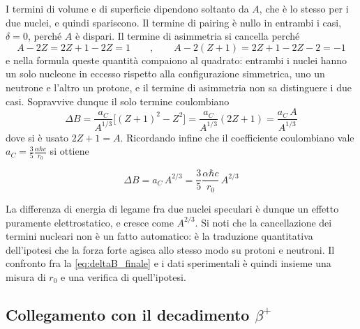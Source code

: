I termini di volume e di superficie dipendono soltanto da $A$, che è lo stesso per i due nuclei, e quindi spariscono. Il termine di pairing è nullo in entrambi i casi, $\delta = 0$, perché $A$ è dispari. Il termine di asimmetria si cancella perché
%
\begin{equation*}
    A - 2Z = 2Z + 1 - 2Z = 1 \qquad , \qquad A - 2(Z+1) = 2Z+1-2Z-2 = -1
\end{equation*}
e nella formula queste quantità compaiono al quadrato: entrambi i nuclei hanno un solo nucleone in eccesso rispetto alla configurazione simmetrica, uno un neutrone e l'altro un protone, e il termine di asimmetria non sa distinguere i due casi. Sopravvive dunque il solo termine coulombiano
%
\begin{equation}
    \Delta B = \frac{a_C}{A^{1/3}}\Big[(Z+1)^2 - Z^2\Big] = \frac{a_C}{A^{1/3}}\left(2Z+1\right) = \frac{a_C \, A}{A^{1/3}}
    \label{eq:deltaB_speculari}
\end{equation}
dove si è usato $2Z + 1 = A$. Ricordando infine che il coefficiente coulombiano vale $a_C = \frac{3}{5}\frac{\alpha \hbar c}{r_0}$ si ottiene

\begin{tcolorbox}[colback=black!5!white, colframe=black!45!white, boxrule=0.8pt]
\begin{equation}
    \Delta B = a_C \, A^{2/3} = \frac{3}{5}\frac{\alpha \hbar c}{r_0} \, A^{2/3}
    \label{eq:deltaB_finale}
\end{equation}
\end{tcolorbox}
La differenza di energia di legame fra due nuclei speculari è dunque un effetto puramente elettrostatico, e cresce come $A^{2/3}$. Si noti che la cancellazione dei termini nucleari non è un fatto automatico: è la traduzione quantitativa dell'ipotesi che la forza forte agisca allo stesso modo su protoni e neutroni. Il confronto fra la \eqref{eq:deltaB_finale} e i dati sperimentali è quindi insieme una misura di $r_0$ e una verifica di quell'ipotesi.

\subsection{Collegamento con il decadimento $\beta^+$}

